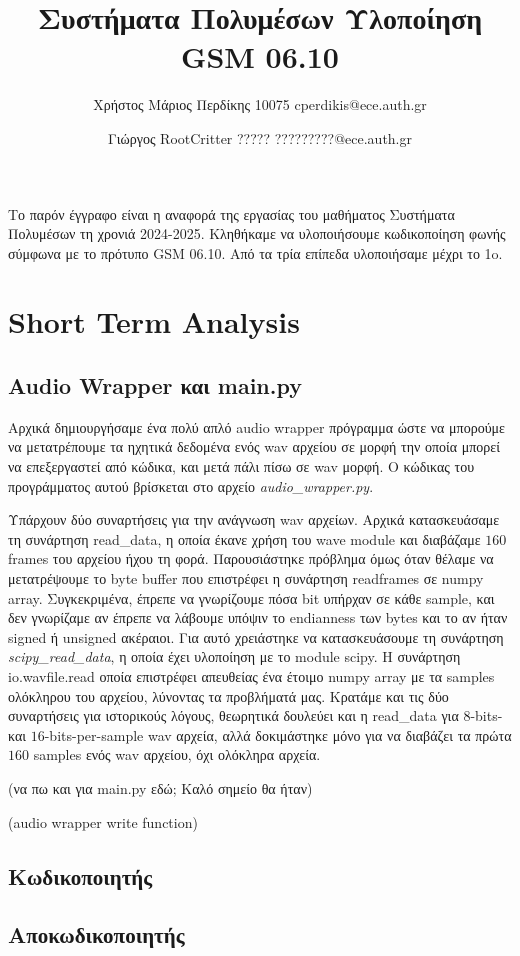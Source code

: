 \documentclass{article}
\title{Συστήματα Πολυμέσων Υλοποίηση GSM 06.10}
\author{Χρήστος Μάριος Περδίκης 10075 cperdikis@ece.auth.gr 
\and Γιώργος RootCritter ?????  ?????????@ece.auth.gr}
\date{}
\begin{document}
 \maketitle Το παρόν έγγραφο είναι η αναφορά της
εργασίας του μαθήματος Συστήματα Πολυμέσων τη χρονιά 2024-2025.
Κληθήκαμε να υλοποιήσουμε κωδικοποίηση φωνής σύμφωνα με το πρότυπο GSM
06.10. Από τα τρία επίπεδα υλοποιήσαμε μέχρι το 1o.

\section{Short Term Analysis} 
\subsection{Audio Wrapper και main.py} Αρχικά
δημιουργήσαμε ένα πολύ απλό audio wrapper πρόγραμμα ώστε να μπορούμε να
μετατρέπουμε τα ηχητικά δεδομένα ενός wav αρχείου σε μορφή την οποία
μπορεί να επεξεργαστεί από κώδικα, και μετά πάλι πίσω σε wav μορφή. Ο
κώδικας του προγράμματος αυτού βρίσκεται στο αρχείο
\emph{audio\_wrapper.py}. 

Υπάρχουν δύο συναρτήσεις για την ανάγνωση wav αρχείων. Αρχικά
κατασκευάσαμε τη συνάρτηση read\_data, η οποία έκανε χρήση του wave 
module και διαβάζαμε $160$ frames του αρχείου ήχου τη 
φορά. Παρουσιάστηκε
πρόβλημα όμως όταν θέλαμε να μετατρέψουμε το byte buffer που επιστρέφει
η συνάρτηση readframes σε numpy array. Συγκεκριμένα, έπρεπε να γνωρίζουμε
πόσα bit υπήρχαν σε κάθε sample, και δεν γνωρίζαμε αν έπρεπε να
λάβουμε υπόψιν το endianness των bytes και το αν ήταν signed ή unsigned
ακέραιοι. Για αυτό χρειάστηκε να κατασκευάσουμε τη συνάρτηση 
\emph{scipy\_read\_data}, η οποία έχει υλοποίηση με το module scipy. Η 
συνάρτηση io.wavfile.read οποία επιστρέφει απευθείας ένα
έτοιμο numpy array με τα samples ολόκληρου του αρχείου, λύνοντας τα 
προβλήματά μας. Κρατάμε και τις δύο συναρτήσεις για ιστορικούς λόγους, 
θεωρητικά δουλεύει και η read\_data για $8$-bits- και $16$-bits-per-sample
wav αρχεία, αλλά δοκιμάστηκε μόνο για να διαβάζει τα πρώτα $160$ samples
ενός wav αρχείου, όχι ολόκληρα αρχεία.

(να πω και για main.py εδώ; Καλό σημείο θα ήταν)

(audio wrapper write function)

\subsection{Κωδικοποιητής}
\subsection{Αποκωδικοποιητής}
\end{document}
